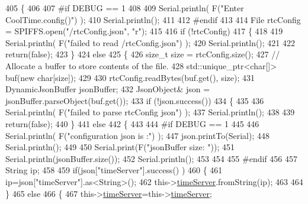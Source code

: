 \begin{DoxyCode}
405 \{
406 
407 \textcolor{preprocessor}{#if DEBUG == 1 }
408 
409     Serial.println( F(\textcolor{stringliteral}{"Enter CoolTime.config()"}) );
410     Serial.println();
411 
412 \textcolor{preprocessor}{#endif }
413 
414     File rtcConfig = SPIFFS.open(\textcolor{stringliteral}{"/rtcConfig.json"}, \textcolor{stringliteral}{"r"});
415 
416     \textcolor{keywordflow}{if} (!rtcConfig) 
417     \{
418     
419         Serial.println( F(\textcolor{stringliteral}{"failed to read /rtcConfig.json"}) );
420         Serial.println();
421 
422         \textcolor{keywordflow}{return}(\textcolor{keyword}{false});
423     \}
424     \textcolor{keywordflow}{else}
425     \{
426         \textcolor{keywordtype}{size\_t} size = rtcConfig.size();
427         \textcolor{comment}{// Allocate a buffer to store contents of the file.}
428         std::unique\_ptr<char[]> buf(\textcolor{keyword}{new} \textcolor{keywordtype}{char}[size]);
429 
430         rtcConfig.readBytes(buf.get(), size);
431         DynamicJsonBuffer jsonBuffer;
432         JsonObject& json = jsonBuffer.parseObject(buf.get());
433         \textcolor{keywordflow}{if} (!json.success()) 
434         \{
435 
436             Serial.println( F(\textcolor{stringliteral}{"failed to parse rtcConfig json"}) );
437             Serial.println();
438 
439             \textcolor{keywordflow}{return}(\textcolor{keyword}{false});
440         \} 
441         \textcolor{keywordflow}{else}
442         \{  
443         
444 \textcolor{preprocessor}{        #if DEBUG == 1 }
445 
446             Serial.println( F(\textcolor{stringliteral}{"configuration json is :"}) );
447             json.printTo(Serial);
448             Serial.println();
449 
450             Serial.print(F(\textcolor{stringliteral}{"jsonBuffer size: "}));
451             Serial.println(jsonBuffer.size());
452             Serial.println();
453 
454 
455 \textcolor{preprocessor}{        #endif}
456 
457             String ip;
458             
459             \textcolor{keywordflow}{if}(json[\textcolor{stringliteral}{"timeServer"}].success() )
460             \{           
461                  ip=json[\textcolor{stringliteral}{"timeServer"}].as<String>();
462                 this->\hyperlink{class_cool_time_ad2b9858f399108cb440dd1e908916f04}{timeServer}.fromString(ip);
463                 
464             \}
465             \textcolor{keywordflow}{else}
466             \{
467                 this->\hyperlink{class_cool_time_ad2b9858f399108cb440dd1e908916f04}{timeServer}=this->\hyperlink{class_cool_time_ad2b9858f399108cb440dd1e908916f04}{timeServer};

\end{DoxyCode}
